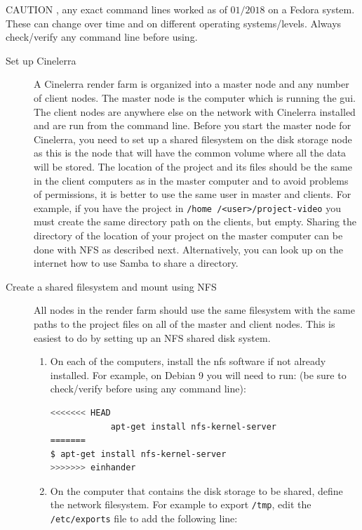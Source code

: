 {\color{red} CAUTION }, any exact command lines worked as of $01/2018$ on a Fedora system.  These can change over time and on different operating systems/levels.  Always check/verify any command line before using.

\begin{description}
    \item[Set up Cinelerra] A Cinelerra render farm is organized into a master node and any number of client nodes.  The master node is the computer which is running the gui.  The client nodes are anywhere else on the network with Cinelerra installed and are run from the command line.  Before you start the master node for Cinelerra, you need to set up a shared filesystem on the disk storage node as this is the node that will have the common volume where all the data will be stored.  
    The location of the project and its files should be the same in the client computers as in the master computer and to avoid problems of permissions, it is better to use the same user in master and clients. 
    For example, if you have the project in \texttt{/home /<user>/project-video} you must create the same directory path on the clients, but empty.  Sharing the directory of the location of your project on the master computer can be done with NFS as described next.  Alternatively, you can look up on the internet how to use Samba to share a directory.
    \item[Create a shared filesystem and mount using NFS] All nodes in the render farm should use the same filesystem with the same paths to the project files on all of the master and client nodes.  This is easiest to do by setting up an NFS shared disk system.
    \begin{enumerate}
        \item On each of the computers, install the nfs software if not already installed.  For example, on Debian 9
        you will need to run: (be sure to check/verify before using any command line):
        \begin{lstlisting}[language=bash]
<<<<<<< HEAD
            apt-get install nfs-kernel-server
=======
$ apt-get install nfs-kernel-server
>>>>>>> einhander
        \end{lstlisting}
        \item On the computer that contains the disk storage to be shared, define the network filesystem.  For
        example to export \texttt{/tmp}, edit the \texttt{/etc/exports} file to add the following line:
        \begin{lstlisting}[language=bash]

\end{lstlisting}
\end{enumerate}
\end{description}
